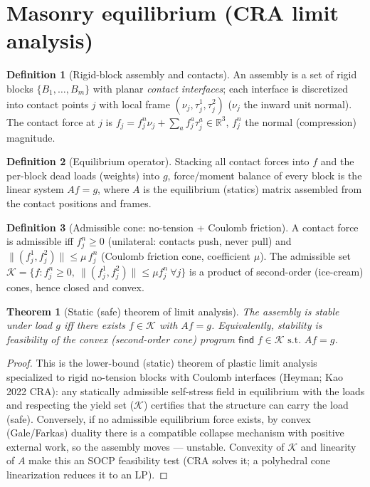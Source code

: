 \documentclass[11pt]{article}
\theoremstyle{definition}\newtheorem{definition}{Definition}[section]
\theoremstyle{plain}\newtheorem{theorem}{Theorem}[section]
\newcommand{\R}{\mathbb{R}}\newcommand{\Z}{\mathbb{Z}}\newcommand{\Norm}[1]{\lVert #1\rVert}
\begin{document}
\section{Masonry equilibrium (CRA limit analysis)}
\begin{definition}[Rigid-block assembly and contacts]
An assembly is a set of rigid blocks $\{B_1,\dots,B_m\}$ with planar \emph{contact interfaces}; each interface
is discretized into contact points $j$ with local frame $(\nu_j,\tau_j^1,\tau_j^2)$ ($\nu_j$ the inward unit
normal). The contact force at $j$ is $f_j=f_j^n\nu_j+\sum_a f_j^{a}\tau_j^a\in\R^3$, $f_j^n$ the normal
(compression) magnitude.
\end{definition}
\begin{definition}[Equilibrium operator]
Stacking all contact forces into $f$ and the per-block dead loads (weights) into $g$, force/moment balance of
every block is the linear system $A f = g$, where $A$ is the equilibrium (statics) matrix assembled from the
contact positions and frames.
\end{definition}
\begin{definition}[Admissible cone: no-tension + Coulomb friction]
A contact force is admissible iff $f_j^n\ge0$ (unilateral: contacts push, never pull) and
$\Norm{(f_j^1,f_j^2)}\le\mu\,f_j^n$ (Coulomb friction cone, coefficient $\mu$). The admissible set
$\mathcal K=\{f: f_j^n\ge0,\ \Norm{(f_j^1,f_j^2)}\le\mu f_j^n\ \forall j\}$ is a product of second-order
(ice-cream) cones, hence closed and convex.
\end{definition}
\begin{theorem}[Static (safe) theorem of limit analysis]\label{thm:cra}
The assembly is stable under load $g$ iff there exists $f\in\mathcal K$ with $Af=g$. Equivalently, stability
is feasibility of the convex (second-order cone) program $\textsf{find } f\in\mathcal K \text{ s.t. } Af=g$.
\end{theorem}
\begin{proof}
This is the lower-bound (static) theorem of plastic limit analysis specialized to rigid no-tension blocks
with Coulomb interfaces (Heyman; Kao 2022 CRA): any statically admissible self-stress field in equilibrium
with the loads and respecting the yield set ($\mathcal K$) certifies that the structure can carry the load
(safe). Conversely, if no admissible equilibrium force exists, by convex (Gale/Farkas) duality there is a
compatible collapse mechanism with positive external work, so the assembly moves --- unstable. Convexity of
$\mathcal K$ and linearity of $A$ make this an SOCP feasibility test (CRA solves it; a polyhedral cone
linearization reduces it to an LP).
\end{proof}
\end{document}
